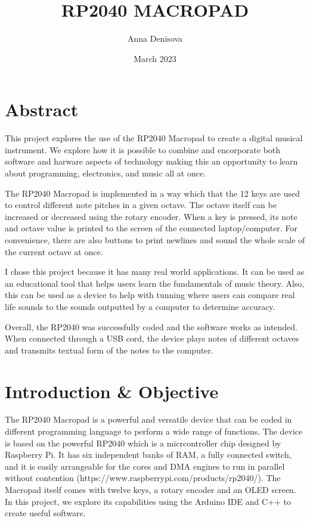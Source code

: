 \documentclass{article}
\title{RP2040 MACROPAD}
\author{Anna Denisova}
\date{March 2023}
\begin{document}
\maketitle
\tableofcontents

\newpage

\section{Abstract}

This project explores the use of the RP2040 Macropad to create a digital musical instrument. We explore how it is possible to combine and encorporate both software and harware aspects of technology making this an opportunity to learn about programming, electronics, and music all at once. 

The RP2040 Macropad is implemented in a way which that the 12 keys are used to control different note pitches in a given octave. The octave itself can be increased or decreased using the rotary encoder. When a key is pressed, its note and octave value is printed to the screen of the connected laptop/computer. For convenience, there are also buttons to print newlines and sound the whole scale of the current octave at once.

I chose this project because it has many real world applications. It can be used as an educational tool that helps users learn the fundamentals of music theory. Also, this can be used as a device to help with tunning where users can compare real life sounds to the sounds outputted by a computer to determine accuracy.

Overall, the RP2040 was successfully coded and the software works as intended. When connected through a USB cord, the device plays notes of different octaves and transmits textual form of the notes to the computer. 

\section{Introduction \& Objective}

The RP2040 Macropad is a powerful and versatile device that can be coded in different programming language to perform a wide range of functions. The device is based on the powerful RP2040 which is a micrcontroller chip designed by Raspberry Pi. It has six independent banks of RAM, a fully connected switch, and it is easily arrangeable for the cores and DMA engines to run in parallel without contention (https://www.raspberrypi.com/products/rp2040/). The Macropad itself comes with twelve keys, a rotary encoder and an OLED screen. In this project, we explore its capabilities using the Arduino IDE and C++ to create useful software. 
\end{document}
